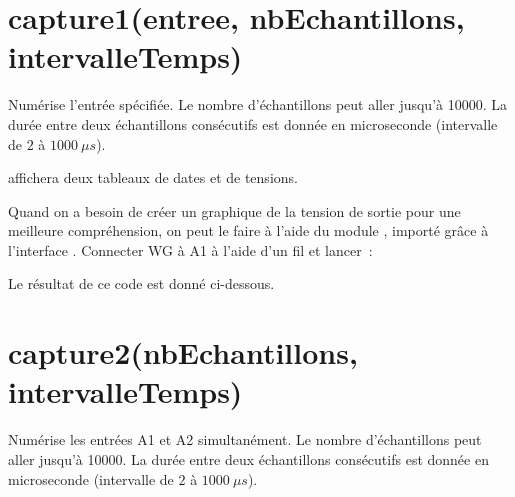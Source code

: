 \documentclass[a4paper,12pt,french]{sphinxmanual}
\let\sphinxpxdimen\pdfpxdimen\else\newdimen\sphinxpxdimen
\begin{document}
\section{capture1(entree, nbEchantillons, intervalleTemps)}
\label{\detokenize{7.1:capture1-entree-nbechantillons-intervalletemps}}
Numérise l’entrée spécifiée. Le nombre d’échantillons peut aller jusqu’à
10000. La durée entre deux échantillons consécutifs est donnée en
microseconde (intervalle de \(2\) à \(1000~\mu s\)).

\begin{sphinxVerbatim}[commandchars=\\\{\}]
   
\end{sphinxVerbatim}

affichera deux tableaux de dates et de tensions.

Quand on a besoin de créer un graphique de la tension de sortie pour
une meilleure compréhension, on peut le faire à l’aide du module ,
importé grâce à l’interface . Connecter WG à A1 à l’aide
d’un fil et lancer :

\begin{sphinxVerbatim}[commandchars=\\\{\}]
   
 
    
\end{sphinxVerbatim}

Le résultat de ce code est donné ci-dessous.

\noindent\sphinxincludegraphics[width=400\sphinxpxdimen]{{sine}.pdf}


\section{capture2(nbEchantillons, intervalleTemps)}
\label{\detokenize{7.1:capture2-nbechantillons-intervalletemps}}
Numérise les entrées A1 et A2 simultanément. Le nombre d’échantillons
peut aller jusqu’à 10000. La durée entre deux échantillons consécutifs
est donnée en microseconde (intervalle de \(2\) à \(1000~\mu s\)).
\end{document}
